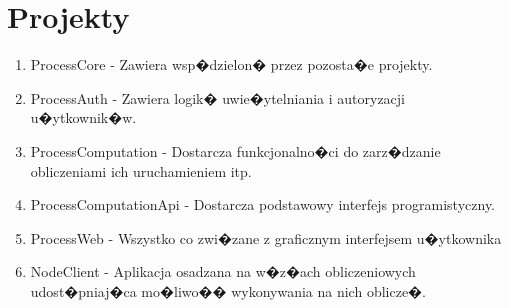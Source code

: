 \documentclass{article}
\begin{document}
\section{Projekty}
{\small
\begin{enumerate}
  \item ProcessCore - Zawiera wsp�dzielon� przez pozosta�e projekty.
  \item ProcessAuth - Zawiera logik� uwie�ytelniania i autoryzacji u�ytkownik�w. 
  \item ProcessComputation - Dostarcza funkcjonalno�ci do zarz�dzanie obliczeniami ich uruchamieniem itp.
  \item ProcessComputationApi - Dostarcza podstawowy interfejs programistyczny. 
  \item ProcessWeb - Wszystko co zwi�zane z graficznym interfejsem u�ytkownika
  \item NodeClient - Aplikacja osadzana na w�z�ach obliczeniowych udost�pniaj�ca mo�liwo�� wykonywania na nich oblicze�.
\end{enumerate}
}
\end{document}
